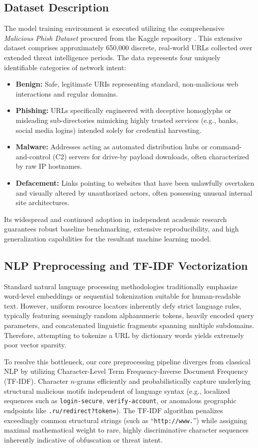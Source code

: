 \documentclass[conference]{IEEEtran}
\begin{document}
\subsection{Dataset Description}
The model training environment is executed utilizing the comprehensive \textit{Malicious Phish Dataset} procured from the Kaggle repository \cite{kaggle2022phish}. This extensive dataset comprises approximately 650,000 discrete, real-world URLs collected over extended threat intelligence periods. The data represents four uniquely identifiable categories of network intent: 
\begin{itemize}
    \item \textbf{Benign:} Safe, legitimate URIs representing standard, non-malicious web interactions and regular domains.
    \item \textbf{Phishing:} URLs specifically engineered with deceptive homoglyphs or misleading sub-directories mimicking highly trusted services (e.g., banks, social media logins) intended solely for credential harvesting.
    \item \textbf{Malware:} Addresses acting as automated distribution hubs or command-and-control (C2) servers for drive-by payload downloads, often characterized by raw IP hostnames.
    \item \textbf{Defacement:} Links pointing to websites that have been unlawfully overtaken and visually altered by unauthorized actors, often possessing unusual internal site architectures.
\end{itemize}
Its widespread and continued adoption in independent academic research guarantees robust baseline benchmarking, extensive reproducibility, and high generalization capabilities for the resultant machine learning model.

\subsection{NLP Preprocessing and TF-IDF Vectorization}
Standard natural language processing methodologies traditionally emphasize word-level embeddings or sequential tokenization suitable for human-readable text. However, uniform resource locators inherently defy strict language rules, typically featuring seemingly random alphanumeric tokens, heavily encoded query parameters, and concatenated linguistic fragments spanning multiple subdomains. Therefore, attempting to tokenize a URL by dictionary words yields extremely poor vector sparsity. 

To resolve this bottleneck, our core preprocessing pipeline diverges from classical NLP by utilizing Character-Level Term Frequency-Inverse Document Frequency (TF-IDF). Character $n$-grams efficiently and probabilistically capture underlying structural malicious motifs independent of language syntax (e.g., localized sequences such as \texttt{login-secure}, \texttt{verify-account}, or anomalous geographic endpoints like \texttt{.ru/redirect?token=}). The TF-IDF algorithm penalizes exceedingly common structural strings (such as ``\texttt{http://www.}'') while assigning maximal mathematical weight to rare, highly discriminative character sequences inherently indicative of obfuscation or threat intent.
\end{document}
